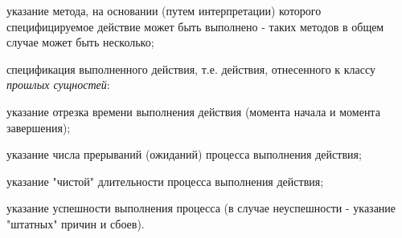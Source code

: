 \begin{SCn}
{\begin{scnitemize}
\begin{scnitemizeii}
\end{scnitemizeii}
\item указание метода, на основании (путем интерпретации) которого специфицируемое действие может быть выполнено - таких методов в общем случае может быть несколько;
\item спецификация выполненного действия, т.е. действия, отнесенного к классу \textit{прошлых сущностей}:
\begin{scnitemizeii}
\item указание отрезка времени выполнения действия (момента начала и момента завершения);
\item указание числа прерываний (ожиданий) процесса выполнения действия;
\item указание "чистой"{} длительности процесса выполнения действия;
\item указание успешности выполнения процесса (в случае неуспешности - указание "штатных"{} причин и сбоев).
\end{scnitemizeii}
\end{scnitemize}}


\end{SCn}